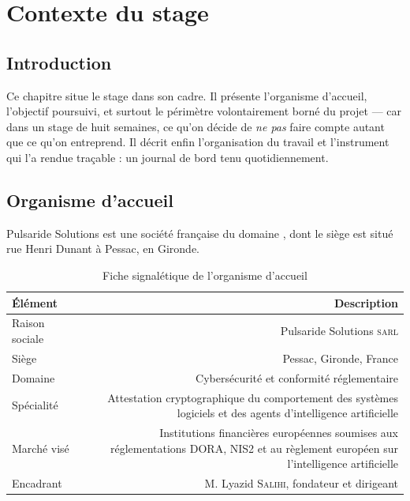 \chapter{Contexte du stage}
\label{chap:contexte}

\section*{Introduction}

Ce chapitre situe le stage dans son cadre. Il présente l'organisme d'accueil, l'objectif
poursuivi, et surtout le périmètre volontairement borné du projet --- car dans un stage de huit
semaines, ce qu'on décide de \emph{ne pas} faire compte autant que ce qu'on entreprend. Il décrit
enfin l'organisation du travail et l'instrument qui l'a rendue traçable : un journal de bord tenu
quotidiennement.

\section{Organisme d'accueil}

Pulsaride Solutions est une société française du domaine , dont le siège est
situé rue Henri Dunant à Pessac, en Gironde.

\begin{table}[htbp]
  \centering
  \caption{Fiche signalétique de l'organisme d'accueil}
  \label{tab:entreprise}
  \small
  \begin{tabularx}{\textwidth}{@{}>{\raggedright\arraybackslash}p{3.4cm} R@{}}
    \toprule
    \sffamily\bfseries\color{navy}Élément &
    \sffamily\bfseries\color{navy}Description \\
    \midrule
    Raison sociale   & Pulsaride Solutions \textsc{sarl} \\
    Siège            & Pessac, Gironde, France \\
    Domaine          & Cybersécurité et conformité réglementaire \\
    Spécialité       & Attestation cryptographique du comportement des systèmes logiciels et des agents d'intelligence artificielle \\
    Marché visé      & Institutions financières européennes soumises aux réglementations DORA, NIS2 et au règlement européen sur l'intelligence artificielle \\
    Encadrant        & M. Lyazid \textsc{Salihi}, fondateur et dirigeant \\
    \bottomrule
  \end{tabularx}
\end{table}

